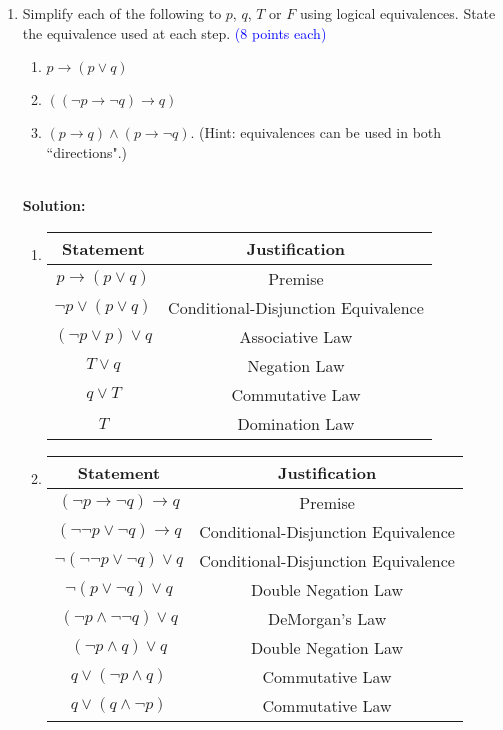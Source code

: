 \documentclass{article}
\newcommand{\pte}[1]{\textcolor{blue}{(#1 points each)}}
\newenvironment{solution}
{
\par
\color{blue}
\vspace{2mm}
\hline \\
\textbf{Solution:}
}
{
\vspace{2mm}
\newpage
}
\begin{document}
\begin{enumerate}
    \item Simplify each of the following to $p$, $q$, $T$ or $F$ using logical equivalences. State the equivalence used at each step. \pte 8
    \begin{enumerate}
        \item $p \rightarrow (p \lor q)$
        \item $((\lnot p \rightarrow \lnot q) \rightarrow q)$
        \item $(p \rightarrow q) \wedge (p \rightarrow \lnot q)$. (Hint: equivalences can be used in both ``directions".)
    \end{enumerate}
    
    \begin{solution}
    \begin{enumerate}
        \item
        \begin{tabular}{c|c}
        Statement & Justification\\
        \hline
        $p \rightarrow (p \lor q)$ & Premise\\
        $\neg p \lor (p \lor q)$ & Conditional-Disjunction Equivalence \\
        $(\neg p \lor p) \lor q$ & Associative Law \\
        $T \lor q$ & Negation Law \\
        $q \lor T$ & Commutative Law \\
        $T$ & Domination Law \\
        \end{tabular}
        \item
        \begin{tabular}{c|c}
        Statement & Justification\\
        \hline
        $(\lnot p \rightarrow \lnot q) \rightarrow q$ & Premise\\
        $(\neg \neg p \lor \neg q) \rightarrow q$ & Conditional-Disjunction Equivalence \\
        $\neg(\neg \neg p \lor \neg q) \lor q$ & Conditional-Disjunction Equivalence \\
        $\neg (p \lor \neg q) \lor q$ & Double Negation Law \\
        $(\neg p \land \neg \neg q) \lor q$ & DeMorgan's Law \\
        $(\neg p \land  q) \lor q$ & Double Negation Law \\
        $q \lor (\neg p \land  q)$ & Commutative Law \\
        $q \lor (q \land \neg p)$ & Commutative Law \\

\end{tabular}
\end{enumerate}
\end{solution}
\end{enumerate}
\end{document}
